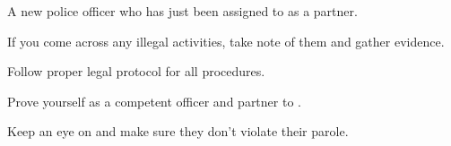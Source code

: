 \documentclass[char]{guildcamp4}
\begin{document}
\name{\cCgood{}}

\begin{itemz}[Backstory]
	\item A new police officer who has just been assigned to \cCbad{} as a partner.
\end{itemz}

\begin{itemz}[Goals]
	\item If you come across any illegal activities, take note of them and gather evidence.
	\item Follow proper legal protocol for all procedures.
	\item Prove yourself as a competent officer and partner to \cCbad{}.
	\item Keep an eye on \cProbie{} and make sure they don't violate their parole. 
\end{itemz}

\begin{itemz}[Notes]
	\item 
\end{itemz}

\begin{contacts}
	\contact{\cTest{}}
\end{contacts}
\end{document}
